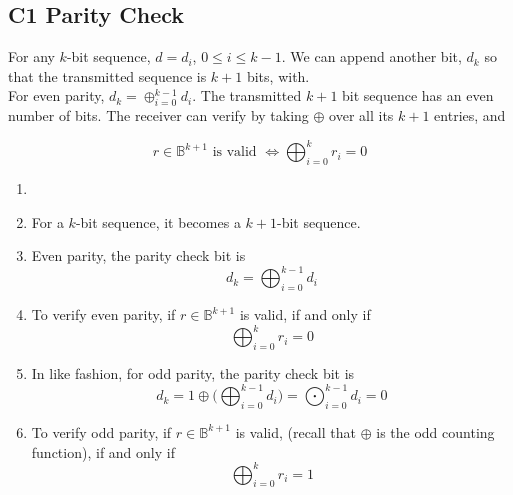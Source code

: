 \documentclass[../../main.tex]{subfiles}
\begin{document}
\subsection{C1 Parity Check}
\begin{definition}
    For any $k$-bit sequence, $d = d_i$, $0\leq i\leq k-1$. We can append another bit, $d_k$ so that the transmitted sequence is $k+1$ bits, with. \\
    
    For even parity, $d_k = \oplus_{i=0}^{k-1}d_i$. The transmitted $k+1$ bit sequence has an even number of bits. The receiver can verify by taking $\oplus$ over all its $k+1$ entries, and 
\end{definition}
    
    \[
    r\in\mathbb{B}^{k+1}\text{ is valid }\iff \bigoplus_{i=0}^{k}r_i = 0
    \]
\begin{wtr}
\begin{enumerate}
    \item[]
    \item For a $k$-bit sequence, it becomes a $k+1$-bit sequence.
    \item Even parity, the parity check bit is
    \[
    d_k = \bigoplus_{i=0}^{k-1}d_i
    \]
    \item To verify even parity, if $r\in \mathbb{B}^{k+1}$ is valid, if and only if
    \[
    \bigoplus_{i=0}^kr_i = 0
    \]
    \item In like fashion, for odd parity, the parity check bit is
    \[
    d_k = 1\oplus\biggl(\bigoplus_{i=0}^{k-1}d_i\biggr)=\bigodot_{i=0}^{k-1}d_i = 0
    \]
    \item To verify odd parity, if $r\in \mathbb{B}^{k+1}$ is valid, (recall that $\oplus$ is the odd counting function), if and only if
    \[
    \bigoplus_{i=0}^kr_i = 1
    \]
\end{enumerate}
\end{wtr}    
\end{document}
